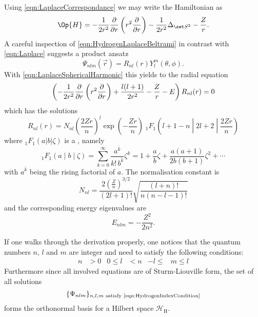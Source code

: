 \noindent
Using \eqref{eqn:LaplaceCorrespondance} we may write the Hamiltonian as
\begin{equation}
	\label{eqn:HydrogenLaplaceBeltrami}
	\Op{H} = -\frac{1}{2r^2} \laplaceRadial -\frac{1}{2r^2} \laplaceSphere - \frac{Z}{r}.
\end{equation}
A careful inspection of \eqref{eqn:HydrogenLaplaceBeltrami}
in contrast with \eqref{eqn:Laplace}
suggests a product ansatz
\[ \Psi_{nlm}(\vec{r}) = R_{nl}(r) Y_l^m(\theta, \phi). \]
%
With \eqref{eqn:LaplaceSphericalHarmonic} this yields to the radial equation
\begin{equation}
	\left( - \frac{1}{2r^2} \frac{\partial}{\partial r} \left( r^2 \frac{\partial}{\partial r} \right) + \frac{l (l+1)}{2 r^2} - \frac{Z}{r} - E \right) R_{nl}(r) = 0
	\label{eqn:HydrogenRadial}
\end{equation}
which has the solutions~\cite{Mueller2000}
\begin{equation}
	 R_{nl}(r) = N_{nl} \left(\frac{2Zr}{n}\right)^l \exp\left(-\frac{Zr}{n} \right)
\;_1F_1\!\left(l+1-n \middle| 2l+2 \middle|\frac{2Zr}{n}\right)
	\label{eqn:HydrogenRadialSolution}
\end{equation}
where $_1F_1\!\left(a|b|\zeta\right)$ is a ,
namely~\cite{Avery2006}
\begin{equation}
	_1F_1\left(a \middle| b \middle| \zeta\right) =
	\sum_{k=0}^\infty \frac{a^{\bar{k}}}{k! \, b^{\bar{k}}} \zeta^k =
	1 + \frac{a}{b} \zeta + \frac{a(a+1)}{2b(b+1)} \zeta^2 + \cdots
	\label{eqn:ConfluentHypergeometric}
\end{equation}
with $a^{\bar{k}}$ being the rising factorial of $a$.
The normalisation constant is
\[ N_{nl} = \frac{2 \left( \frac{Z}{n} \right)^{3/2}}{(2l+1)!} \sqrt{ \frac{(l+n)!}{n (n-l-1)!}} \]
and the corresponding energy eigenvalues are
\begin{equation}
	E_{nlm} = - \frac{Z^2}{2n^2}.
	\label{eqn:HydrogenEnergyLevels}
\end{equation}

If one walks through the derivation properly,
one notices that the quantum numbers $n$, $l$ and $m$ are integer and need to satisfy
the following conditions:
\begin{align}
	\label{eqn:HydrogenIndexCondition}
	n &> 0 & 0 \leq l &< n & -l \leq &m \leq l
\end{align}
Furthermore since all involved equations are of Sturm-Liouville form,
the set of all solutions
\[
	\{\Psi_{nlm} \}_{n,l,m \text{ satisfy \eqref{eqn:HydrogenIndexCondition}}}
\]
forms the orthonormal basis for a Hilbert space $\mathcal{H}_\text{H}$.

